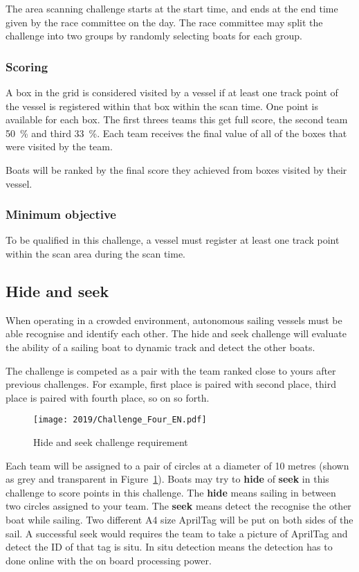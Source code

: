 \documentclass[12pt]{article}
\begin{document}
The area scanning challenge starts at the start time, and ends at the end
time given by the race committee on the day. The race committee may split the
challenge into two groups by randomly selecting boats for each group.

\subsubsection{Scoring}

A box in the grid is considered visited by a vessel if at least one track point
of the vessel is registered within that box within the scan time.
One point is available for each box. The first threes teams this get full score, the second team 50~\% and third 33~\%.
Each team receives the final value of all of the boxes that were visited by the
team. 

Boats will be ranked by the final score they achieved from boxes visited by
their vessel.

\subsubsection{Minimum objective}
To be qualified in this challenge, a vessel must register at least one track
point within the scan area during the scan time.

\subsection{Hide and seek}
When operating in a crowded environment, autonomous sailing vessels must be able
recognise and identify each other. 
The hide and seek challenge will evaluate the ability of a sailing boat to dynamic 
track and detect the other boats.

The challenge is competed as a pair with the team ranked close to yours after previous challenges.
For example, first place is paired with second place, third place is paired with fourth place, so on so forth.


  \begin{figure}[H]
    \centering
    \texttt{[image: 2019/Challenge\_Four\_EN.pdf]}
    \caption{Hide and seek challenge requirement}
    \label{fig:hideandseek}
  \end{figure}

Each team will be assigned to a pair of circles at a diameter of 10 metres (shown as grey and transparent in Figure~\ref{fig:hideandseek}).
Boats may try to \textbf{hide} of \textbf{seek} in this challenge to score points in this challenge.
The \textbf{hide} means sailing in between two circles assigned to your team.
The \textbf{seek} means detect the recognise the other boat while sailing.
Two different A4 size AprilTag will be put on both sides of the sail.
A successful seek would requires the team to take a picture of AprilTag and detect the ID of that tag is situ.
In situ detection means the detection has to done online with the on board processing power. 
\end{document}
